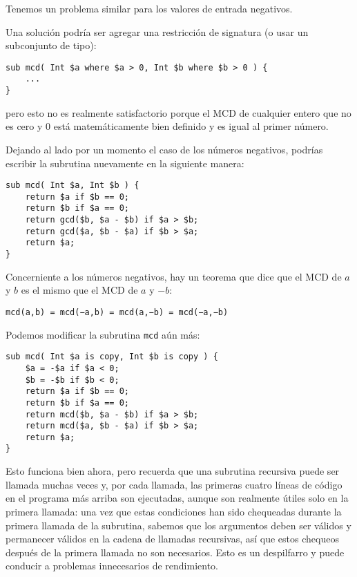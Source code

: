 Tenemos un problema similar para los valores de entrada
negativos.

Una solución podría ser agregar una restricción de signatura
(o usar un subconjunto de tipo):
\begin{verbatim}
sub mcd( Int $a where $a > 0, Int $b where $b > 0 ) {
    ...
}
\end{verbatim}
%

pero esto no es realmente satisfactorio porque el MCD de cualquier
entero que no es cero y 0 está matemáticamente bien definido y
es igual al primer número.

Dejando al lado por un momento el caso de los números 
negativos, podrías escribir la subrutina nuevamente en 
la siguiente manera:

\begin{verbatim}
sub mcd( Int $a, Int $b ) { 
    return $a if $b == 0;
    return $b if $a == 0;
    return gcd($b, $a - $b) if $a > $b;
    return gcd($a, $b - $a) if $b > $a;
    return $a;
}
\end{verbatim}
%

Concerniente a los números negativos, hay un teorema que dice
que el MCD de $a$ y $b$ es el mismo que el MCD de $a$ y $-b$:

\begin{center}
{\tt mcd(a,b) = mcd(−a,b) = mcd(a,−b) = mcd(−a,−b)}
\end{center}
%

Podemos modificar la subrutina {\tt mcd} aún más:

\begin{verbatim}
sub mcd( Int $a is copy, Int $b is copy ) { 
    $a = -$a if $a < 0;
    $b = -$b if $b < 0;
    return $a if $b == 0;
    return $b if $a == 0;
    return mcd($b, $a - $b) if $a > $b;
    return mcd($a, $b - $a) if $b > $a;
    return $a;
}
\end{verbatim}
%

Esto funciona bien ahora, pero recuerda que una subrutina
recursiva puede ser llamada muchas veces y, por cada llamada, 
las primeras cuatro líneas de código en el programa más arriba
son ejecutadas, aunque son realmente útiles solo en la primera 
llamada: una vez que estas condiciones han sido chequeadas durante
la primera llamada de la subrutina, sabemos que los argumentos
deben ser válidos y permanecer válidos en la cadena de llamadas
recursivas, así que estos chequeos después de la primera llamada
no son necesarios. Esto es un despilfarro y puede conducir a problemas 
innecesarios de rendimiento.

